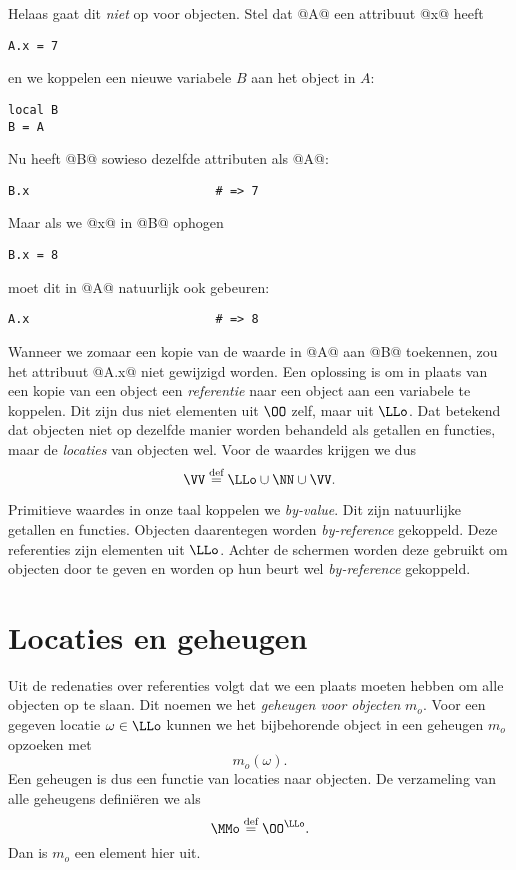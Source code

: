 Helaas gaat dit \emph{niet} op voor objecten. Stel dat @A@ een attribuut @x@ heeft
\begin{lstlisting}
A.x = 7
\end{lstlisting}
en we koppelen een nieuwe variabele $B$ aan het object in $A$:
\begin{lstlisting}
local B
B = A
\end{lstlisting}
Nu heeft @B@ sowieso dezelfde attributen als @A@:
\begin{lstlisting}
B.x                          # => 7
\end{lstlisting}
Maar als we @x@ in @B@ ophogen
\begin{lstlisting}
B.x = 8
\end{lstlisting}
moet dit in @A@ natuurlijk ook gebeuren:
\begin{lstlisting}
A.x                          # => 8
\end{lstlisting}
Wanneer we zomaar een kopie van de waarde in @A@ aan @B@ toekennen, zou het attribuut @A.x@ niet gewijzigd worden. Een oplossing is om in plaats van een kopie van een object een \emph{referentie} naar een object aan een variabele te koppelen. Dit zijn dus niet elementen uit $\OO$ zelf, maar uit $\LLo$. Dat betekend dat objecten niet op dezelfde manier worden behandeld als getallen en functies, maar de \emph{locaties} van objecten wel. Voor de waardes krijgen we dus
\begin{equation*}
  \VV \DEF \LLo \cup \NN \cup \VV.
\end{equation*}

Primitieve waardes in onze taal koppelen we \emph{by-value}. Dit zijn natuurlijke getallen en functies. Objecten daarentegen worden \emph{by-reference} gekoppeld. Deze referenties zijn elementen uit $\LLo$. Achter de schermen worden deze gebruikt om objecten door te geven en worden op hun beurt wel \emph{by-reference} gekoppeld.

\section{Locaties en geheugen}\label{sec:locaties}

Uit de redenaties over referenties volgt dat we een plaats moeten hebben om alle objecten op te slaan. Dit noemen we het \emph{geheugen voor objecten} $m_o$. Voor een gegeven locatie $\omega\in\LLo$ kunnen we het bijbehorende object in een geheugen $m_o$ opzoeken met
\begin{equation*}
  m_o(\omega).
\end{equation*}
Een geheugen is dus een functie van locaties naar objecten. De verzameling van alle geheugens definiëren we als
\begin{equation*}
  \MMo \DEF \OO^{\LLo}.
\end{equation*}
Dan is $m_o$ een element hier uit.

